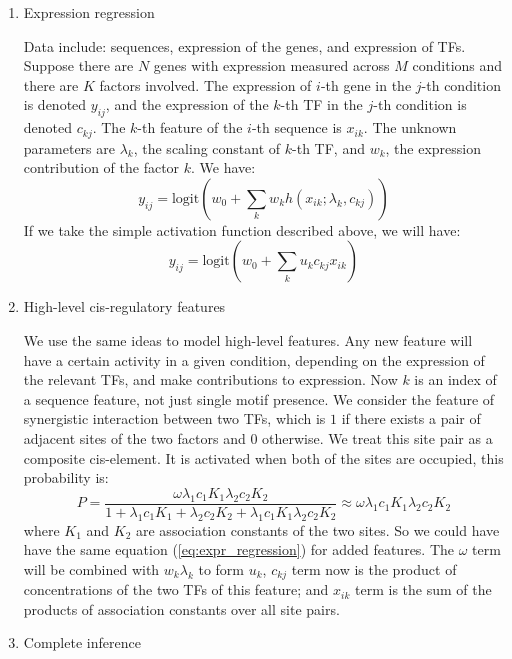 \documentclass[11pt]{article}
\begin{document}
\begin{enumerate}
\begin{enumerate}
\item{Expression regression} 

Data include: sequences, expression of the genes, and expression of TFs. Suppose there are $N$ genes with expression measured across $M$ conditions and there are $K$ factors involved. The expression of $i$-th gene in the $j$-th condition is denoted $y_{ij}$, and the expression of the $k$-th TF in the $j$-th condition is denoted $c_{kj}$. The $k$-th feature of the $i$-th sequence is $x_{ik}$. The unknown parameters are $\lambda_k$, the scaling constant of $k$-th TF, and $w_k$, the expression contribution of the factor $k$. We have: 
\begin{equation}
y_{ij} = \text{logit}\left( w_0 + \sum_{k}w_k h(x_{ik}; \lambda_k, c_{kj}) \right)
\end{equation} 
If we take the simple activation function described above, we will have:
\begin{equation}
y_{ij} = \text{logit}\left( w_0 + \sum_{k}u_k c_{kj} x_{ik} \right)
\label{eq:expr_regression}
\end{equation} 

\item{High-level cis-regulatory features}

We use the same ideas to model high-level features. Any new feature will have a certain activity in a given condition, depending on the expression of the relevant TFs, and make contributions to expression. Now $k$ is an index of a sequence feature, not just single motif presence. We consider the feature of synergistic interaction between two TFs, which is $1$ if there exists a pair of adjacent sites of the two factors and $0$ otherwise. We treat this site pair as a composite cis-element. It is activated when both of the sites are occupied, this probability is:
\begin{equation}
P = \frac{\omega \lambda_1 c_1 K_1 \lambda_2 c_2 K_2}{1 + \lambda_1 c_1 K_1 + \lambda_2 c_2 K_2 + \lambda_1 c_1 K_1 \lambda_2 c_2 K_2} \approx \omega \lambda_1 c_1 K_1 \lambda_2 c_2 K_2
\end{equation}
where $K_1$ and $K_2$ are association constants of the two sites. So we could have have the same equation (\ref{eq:expr_regression}) for added features. The $\omega$ term will be combined with $w_k \lambda_k$ to form $u_k$, $c_{kj}$ term now is the product of concentrations of the two TFs of this feature; and $x_{ik}$ term is the sum of the products of association constants over all site pairs. 

\item{Complete inference}


\end{enumerate}
\end{enumerate}
\end{document}
